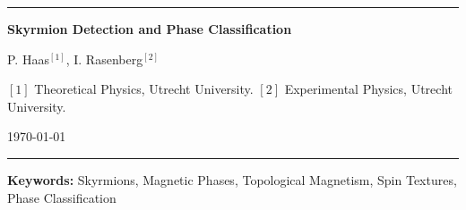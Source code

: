 \begin{center}
	\rule{\textwidth}{1.5pt}
	\vspace{0.5pt}
	
	{\LARGE\bfseries Skyrmion Detection and Phase Classification}
	
	{\large P. Haas$^{[1]}$, I. Rasenberg$^{[2]}$}
	
	{\small$[1]$ Theoretical Physics, Utrecht University. $[2]$ Experimental Physics, Utrecht University.}
	
	{\small \today}
	
	\rule{\textwidth}{1.5pt}
\end{center}

	\begin{abstract}
		
		Skyrmions are topologically protected spin textures that emerge in magnetic systems with competing exchange, Dzyaloshinskii--Moriya (DM), and Zeeman interactions. In this work, a classical spin model on a two-dimensional lattice is investigated using Monte Carlo simulations to study the formation, detection, and thermal stability of skyrmions as a function of dimensionless DM interaction strength \(D/J\), applied magnetic field \(H/J\), and temperature.
		
		A discretized topological charge density is computed from spin configurations and used as the basis for a skyrmion detection algorithm. Local extrema in the smoothed charge density are identified and classified to distinguish isolated skyrmionic textures from spiral and ferromagnetic phases. This allows the construction of phase diagrams in the \((D/J, H/J)\) parameter space.
		
		The phase diagram reveals distinct regions corresponding to ferromagnetic order, spiral spin textures, and skyrmion formation. The skyrmionic region is further analysed as a function of temperature by studying both skyrmion formation upon heating and skyrmion stability upon thermal destruction. Cutoff temperatures for both processes are extracted, providing a quantitative measure of thermal stability across the phase diagram.
		
		The  critical temperature found for destruction is higher than the critical temperature for formation supporting the claim that skyrmions are topologically protected.
		
	\end{abstract}
	
	\noindent\textbf{Keywords:}
	Skyrmions, Magnetic Phases, Topological Magnetism, Spin Textures, Phase Classification
	

